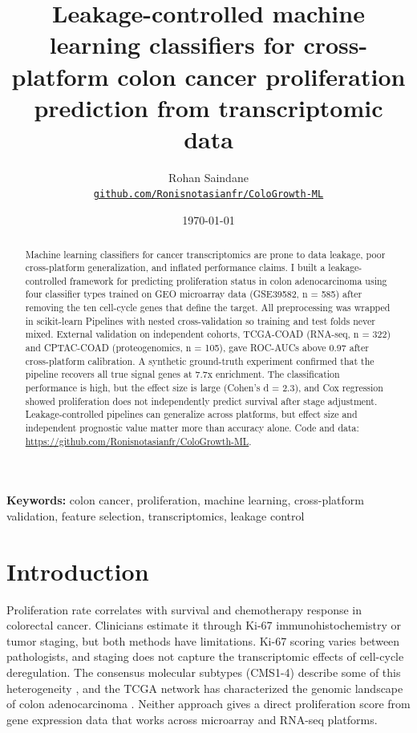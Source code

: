\documentclass[12pt]{article}
\title{Leakage-controlled machine learning classifiers for cross-platform colon cancer proliferation prediction from transcriptomic data}
\author{Rohan Saindane\\
  \texttt{\href{https://github.com/Ronisnotasianfr/ColoGrowth-ML}{github.com/Ronisnotasianfr/ColoGrowth-ML}}
}
\date{\today}
\begin{document}
\maketitle

\begin{abstract}
Machine learning classifiers for cancer transcriptomics are prone to data leakage, poor cross-platform generalization, and inflated performance claims. I built a leakage-controlled framework for predicting proliferation status in colon adenocarcinoma using four classifier types trained on GEO microarray data (GSE39582, n = 585) after removing the ten cell-cycle genes that define the target. All preprocessing was wrapped in scikit-learn Pipelines with nested cross-validation so training and test folds never mixed. External validation on independent cohorts, TCGA-COAD (RNA-seq, n = 322) and CPTAC-COAD (proteogenomics, n = 105), gave ROC-AUCs above 0.97 after cross-platform calibration. A synthetic ground-truth experiment confirmed that the pipeline recovers all true signal genes at 7.7x enrichment. The classification performance is high, but the effect size is large (Cohen's d = 2.3), and Cox regression showed proliferation does not independently predict survival after stage adjustment. Leakage-controlled pipelines can generalize across platforms, but effect size and independent prognostic value matter more than accuracy alone. Code and data: \url{https://github.com/Ronisnotasianfr/ColoGrowth-ML}.
\end{abstract}

\noindent\textbf{Keywords:} colon cancer, proliferation, machine learning, cross-platform validation, feature selection, transcriptomics, leakage control

\section{Introduction}

Proliferation rate correlates with survival and chemotherapy response in colorectal cancer. Clinicians estimate it through Ki-67 immunohistochemistry or tumor staging, but both methods have limitations. Ki-67 scoring varies between pathologists, and staging does not capture the transcriptomic effects of cell-cycle deregulation. The consensus molecular subtypes (CMS1-4) describe some of this heterogeneity \citep{guinney2015}, and the TCGA network has characterized the genomic landscape of colon adenocarcinoma \citep{tcga2012}. Neither approach gives a direct proliferation score from gene expression data that works across microarray and RNA-seq platforms.
\end{document}
